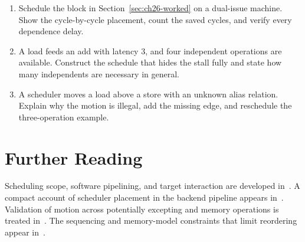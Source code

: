 \begin{enumerate}
\item Schedule the block in Section~\ref{sec:ch26-worked} on a dual-issue machine. \label{ex:ch26-dual-issue} Show the cycle-by-cycle placement, count the saved cycles, and verify every dependence delay.
\item A load feeds an add with latency 3, and four independent operations are available. \label{ex:ch26-hide-latency} Construct the schedule that hides the stall fully and state how many independents are necessary in general.
\item A scheduler moves a load above a store with an unknown alias relation. \label{ex:ch26-memory-edge} Explain why the motion is illegal, add the missing edge, and reschedule the three-operation example.
\end{enumerate}

\section{Further Reading}\label{sec:ch26-reading}

Scheduling scope, software pipelining, and target interaction are developed in~\cite{morgan-1998-optimizing}.
A compact account of scheduler placement in the backend pipeline appears in~\cite{appel-1998-modern}.
Validation of motion across potentially excepting and memory operations is treated in~\cite{safonov-2010-trustworthy}.
The sequencing and memory-model constraints that limit reordering appear in~\cite{wg14-2011-c11}.
